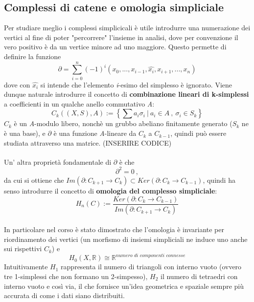 \documentclass{article}
\begin{document}
\subsection{Complessi di catene e omologia simpliciale}
Per studiare meglio i complessi simplicicali è utile introdurre una numerazione dei vertici al fine di poter "percorrere" l'insieme in analisi, dove per convenzione il vero positivo è da un vertice minore ad uno maggiore. Questo permette di definire la funzione \[\partial= \sum_{i=0}^n (-1)^i (x_0,...,x_{i-1},\hat{x_i},x_{i+1},...,x_n)\] dove con \(\hat{x_i}\) si intende che l'elemento \textit{i}-esimo del simplesso è ignorato. Viene dunque naturale introdurre il concetto di \textbf{combinazione lineari di k-simplessi} a coefficienti in un qualche anello commutativo \textit{A}:
\[C_k((X,S),A):= \left\{\sum a_i\sigma_i\ |\ a_i\in A\ ,\ \sigma_i\in S_k\right\}\]
\(C_k\) è un \textit{A}-modulo libero, nonchè un grubbo abeliano finitamente generato (\(S_k\) ne è una base), e \(\partial\) è una funzione \textit{A}-lineare da \(C_k\) a \(C_{k-1}\), quindi può essere studiata attraverso una matrice. (INSERIRE CODICE)\\ \\
Un' altra proprietà fondamentale di \(\partial\) è che \[\partial^2=0\ ,\] da cui si ottiene che \(Im(\partial:C_{k+1}\rightarrow C_k)\subset Ker(\partial:C_{k}\rightarrow C_{k-1})\), quindi ha senso introdurre il concetto di \textbf{omologia del complesso simpliciale}:\\\[H_n(C):=\frac{Ker(\partial:C_{k}\rightarrow C_{k-1})}{Im(\partial:C_{k+1}\rightarrow C_k)}\]\\
In particolare nel corso è stato dimostrato che l'omologia è invariante per riordinamento dei vertici (un morfismo di insiemi simpliciali ne induce uno anche sui rispettivi \(C_k\)) e\\ \[H_0(X,\mathbb{R})\cong\mathbb{R}^{\textit{numero di componenti connesse}}\]
Intuitivamente \(H_1\) rappresenta il numero di triangoli con interno vuoto (ovvero tre 1-simplessi che non formano un 2-simpesso), \(H_2\) il numero di tetraedri con interno vuoto e così via, il che fornisce un'idea geometrica e spaziale sempre più accurata di come i dati siano distribuiti.
\end{document}
